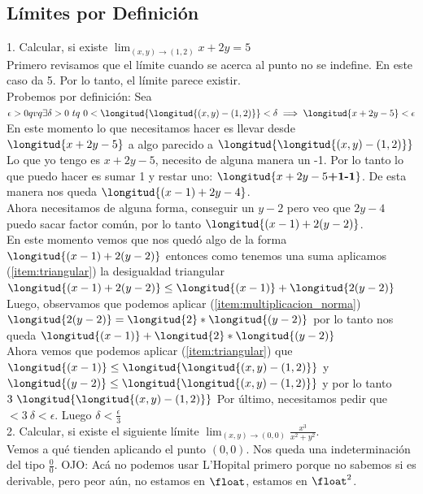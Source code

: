 \documentclass[10pt,a4paper]{article}
\begin{document}
\subsection*{Límites por Definición}
\label{subsec:limites_definicion} 
1. Calcular, si existe $\lim_{(x,y) \rightarrow (1, 2)} x+2y = 5$ \\
Primero revisamos que el límite cuando se acerca al punto no se indefine. En este caso da 5. Por lo tanto, el límite parece existir. \\
Probemos por definición: Sea $\epsilon > 0 qvq \exists \delta > 0 \ tq \ 0 < \longitud{\longitud{(x,y) - (1, 2)}} < \delta \implies \longitud{x+2y-5} < \epsilon$ \\
En este momento lo que necesitamos hacer es llevar desde $\longitud{x+2y-5}$ a algo parecido a $\longitud{\longitud{(x,y) - (1, 2)}}$ \\
Lo que yo tengo es $x+2y-5$, necesito de alguna manera un -1. Por lo tanto lo que puedo hacer es sumar 1 y restar uno: $\longitud{x+2y-5\textbf{+1}\textbf{-1}}$. De esta manera nos queda $\longitud{(x-1)+2y-4}$. \\
Ahora necesitamos de alguna forma, conseguir un $y-2$ pero veo que $2y-4$ puedo sacar factor común, por lo tanto $\longitud{(x-1)+2(y-2)}$. \\
En este momento vemos que nos quedó algo de la forma $\longitud{(x-1) + 2(y-2)}$ entonces como tenemos una suma aplicamos (\ref{item:triangular}) la desigualdad triangular $\longitud{(x-1) + 2(y-2)} \le \longitud{(x-1)} + \longitud{2 (y-2)}$ \\
Luego, observamos que podemos aplicar (\ref{item:multiplicacion_norma})$ \longitud{2 (y-2)} =  \longitud{2} * \longitud{(y-2)}$ por lo tanto nos queda $\longitud{(x-1)} + \longitud{2} * \longitud{(y-2)} $ \\
Ahora vemos que podemos aplicar (\ref{item:triangular}) que $\longitud{(x-1)} \le \longitud{\longitud{(x, y) - (1, 2)}}$ y $\longitud{(y-2)} \le \longitud{\longitud{(x, y) - (1, 2)}}$ y por lo tanto $3 \ \longitud{\longitud{(x, y) - (1, 2)}}$
Por último, necesitamos pedir que $< 3 \ \delta < \epsilon$. Luego $\delta < \frac{\epsilon}{3}$ \\
2. Calcular, si existe el siguiente límite $\lim_{(x,y) \rightarrow (0, 0)} \frac{x^{3}}{x^{2} + y^{2}}$. \\
Vemos a qué tienden aplicando el punto $(0,0)$. Nos queda una indeterminación del tipo $\frac{0}{0}$. OJO: Acá no podemos usar L'Hopital primero porque no sabemos si es derivable, pero peor aún, no estamos en $\float$, estamos en $\float^{2}$. \\
\end{document}
